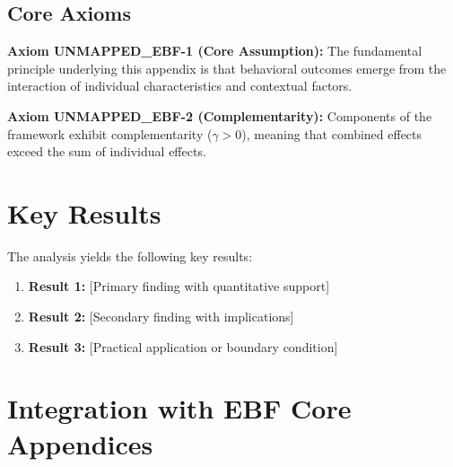 
\subsection{Core Axioms}
\label{sec:ebf-axioms}

\begin{tcolorbox}[colback=yellow!5!white,colframe=yellow!75!black,title=Axiom UNMAPPED_EBF-1: Fundamental Principle]
\textbf{Axiom UNMAPPED_EBF-1 (Core Assumption):}
The fundamental principle underlying this appendix is that behavioral outcomes
emerge from the interaction of individual characteristics and contextual factors.
\end{tcolorbox}

\begin{tcolorbox}[colback=yellow!5!white,colframe=yellow!75!black,title=Axiom UNMAPPED_EBF-2: Complementarity]
\textbf{Axiom UNMAPPED_EBF-2 (Complementarity):}
Components of the framework exhibit complementarity ($\gamma > 0$), meaning
that combined effects exceed the sum of individual effects.
\end{tcolorbox}



\section{Key Results}
\label{sec:ebf-results}

The analysis yields the following key results:

\begin{enumerate}
    \item \textbf{Result 1:} [Primary finding with quantitative support]
    \item \textbf{Result 2:} [Secondary finding with implications]
    \item \textbf{Result 3:} [Practical application or boundary condition]
\end{enumerate}


\section{Integration with EBF Core Appendices}
\label{sec:integration}

